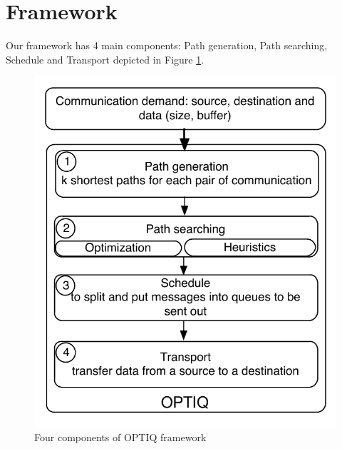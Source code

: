 \section{Framework}
\label{sec:framework}

Our framework has 4 main components: Path generation, Path searching, Schedule and Transport depicted in Figure \ref{fig:framework}.

\begin{figure}[!htb]
\vspace{-0.1in}
\centering
\includegraphics[scale=0.7]{figures/framework.pdf}
\vspace{-0.1in}
\caption{Four components of OPTIQ framework}
\vspace{-0.1in}
\label{fig:framework}
\end{figure}

